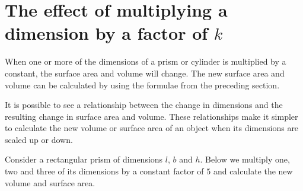 \section{The effect of multiplying a dimension by a factor of $k$}
When one or more of the dimensions of a prism or cylinder is multiplied by a constant, the
surface area and volume will change. The new surface area and volume can be calculated by
using the formulae from the preceding section.\par
It is possible to see a relationship between the change in dimensions and the resulting change
in surface area and volume. These relationships make it simpler to
calculate the new volume or surface area of an object when its dimensions are
scaled up or down.\par
{}
Consider a rectangular prism of dimensions $l$, $b$ and $h$. Below we multiply one, two and
three of its dimensions by a constant factor of $5$ and calculate the new volume and surface area.\par

